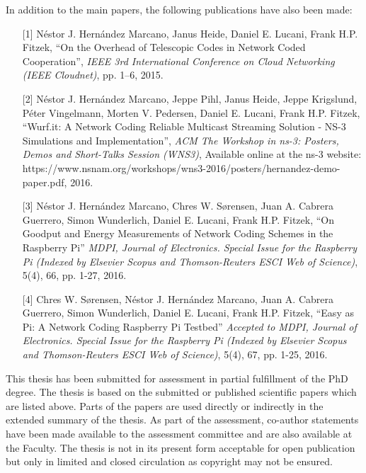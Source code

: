 \noindent In addition to the main papers, the following publications have also been made:
\begin{itemize}

  \item[{[1]}] N\'estor J. Hern\'andez Marcano, Janus Heide, Daniel E. Lucani, Frank H.P. Fitzek, ``On the Overhead of Telescopic Codes in Network Coded Cooperation'', \emph{IEEE 3rd International Conference on Cloud Networking (IEEE Cloudnet)}, pp. 1--6, 2015.

  \item[{[2]}] N\'estor J. Hern\'andez Marcano, Jeppe Pihl, Janus Heide, Jeppe Krigslund, P\'eter Vingelmann, Morten V. Pedersen, Daniel E. Lucani, Frank H.P. Fitzek, ``Wurf.it: A Network Coding Reliable Multicast Streaming Solution - NS-3 Simulations and Implementation'', \emph{ACM The Workshop in ns-3: Posters, Demos and Short-Talks Session (WNS3)}, Available online at the ns-3 website: https://www.nsnam.org/workshops/wns3-2016/posters/hernandez-demo-paper.pdf, 2016.

  \item[{[3]}] N\'estor J. Hern\'andez Marcano, Chres W. S\o rensen, Juan A. Cabrera Guerrero, Simon Wunderlich, Daniel E. Lucani, Frank H.P. Fitzek, ``On Goodput and Energy Measurements of Network Coding Schemes in the Raspberry Pi'' \emph{MDPI, Journal of Electronics. Special Issue for the Raspberry Pi (Indexed by Elsevier Scopus and Thomson-Reuters ESCI Web of Science)}, 5(4), 66, pp. 1-27, 2016.

  \item[{[4]}] Chres W. S\o rensen, N\'estor J. Hern\'andez Marcano, Juan A. Cabrera Guerrero, Simon Wunderlich, Daniel E. Lucani, Frank H.P. Fitzek, ``Easy as Pi: A Network Coding Raspberry Pi Testbed'' \emph{Accepted to MDPI, Journal of Electronics. Special Issue for the Raspberry Pi (Indexed by Elsevier Scopus and Thomson-Reuters ESCI Web of Science)}, 5(4), 67, pp. 1-25, 2016.

\end{itemize}

\noindent This thesis has been submitted for assessment in partial fulfillment of the PhD degree. The thesis is based on the submitted or published scientific papers which are listed above. Parts of the papers are used directly or indirectly in the extended summary of the thesis. As part of the assessment, co-author statements have been made available to the assessment committee and are also available at the Faculty. The thesis is not in its present form acceptable for open publication but only in limited and closed circulation as copyright may not be ensured.
